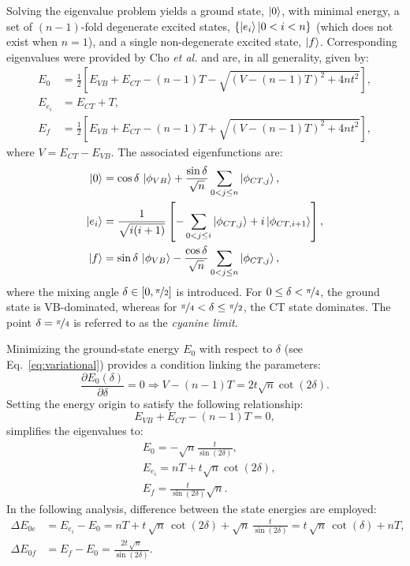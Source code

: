 \documentclass[USenglish]{article}
\begin{document}
Solving the eigenvalue problem yields a ground state, $\ket{0}$, with minimal energy, a set of $(n-1)$-fold degenerate excited states, $\{\ket{e_i} | 0<i< n\}$ (which does not exist when $n=1$), and a single non-degenerate excited state, $\ket{f}$.
Corresponding eigenvalues were provided by Cho \emph{et al.} \cite{choNonlinearOpticalProperties2002} and are, in all generality, given by:
\begin{align}
	E_{0} &= \frac{1}{2} \left[E_{VB} + E_{CT} - (n-1)T - \sqrt{(V - (n-1)T)^2 + 4nt^2}\right], \nonumber\\
	E_{e_i} &= E_{CT} + T, \nonumber\\
	E_{f} &= \frac{1}{2} \left[E_{VB} + E_{CT} - (n-1)T + \sqrt{(V - (n-1)T)^2 + 4nt^2}\right],
\end{align}
where $V = E_{CT} - E_{VB}$. 
The associated eigenfunctions are:
\begin{align}
	\ket{0} &= \cos\delta\,\ket{\phi_{VB}} + \frac{\sin\delta}{\sqrt{n}} \sum_{0<j\leq n} \ket{\phi_{CT,j}},\nonumber\\
	\ket{e_i} &= \frac{1}{\sqrt{i(i+1)}}\left[- \sum_{0<j\leq i} \ket{\phi_{CT,j}} +  i \ket{\phi_{CT,i+1}}\right],\nonumber\\
	\ket{f} &= \sin\delta\,\ket{\phi_{VB}} - \frac{\cos\delta}{\sqrt{n}} \sum_{0<j\leq n} \ket{\phi_{CT,j}},
\end{align}
where the mixing angle $\delta \in [0, \nicefrac{\pi}{2}]$ is introduced. For $0 \leq \delta < \nicefrac{\pi}{4}$, the ground state is VB-dominated, whereas for $\nicefrac{\pi}{4} < \delta \leq \nicefrac{\pi}{2}$, the CT state dominates. The point $\delta = \nicefrac{\pi}{4}$ is referred to as the \textit{cyanine limit}.

Minimizing the ground-state energy $E_0$ with respect to $\delta$ (see Eq.~\eqref{eq:variational})  provides a condition linking the parameters:
\begin{equation}
	\frac{\partial E_0(\delta)}{\partial \delta} = 0 \Rightarrow V - (n-1)T = 2t \sqrt{n} \cot(2\delta). \label{eq:cot}
\end{equation}
Setting the energy origin to satisfy the following relationship: 
\begin{equation}
	E_{VB} + E_{CT} - (n-1)T = 0, \label{eq:eorig}
\end{equation}
simplifies the eigenvalues to:
\begin{align}
	&E_{0} = -\sqrt{n} \frac{t}{\sin(2\delta)}, \nonumber\\
	&E_{e_i} = nT + t \sqrt{n} \cot(2\delta),\nonumber\\
	&E_{f} =  \frac{t}{\sin(2\delta)}\sqrt{n}.\label{eq:energies}
\end{align}
In the following analysis, difference between the state energies are employed:\begin{align}
	\Delta E_{0e} &= E_{e_i} - E_{0} = nT + t\,\sqrt{n}\,\cot{(2\delta)} + \sqrt{n}\,\frac{t}{\sin{(2\delta)}}  = t\,\sqrt{n}\,\cot(\delta) + nT,\nonumber\\
	\Delta E_{0f} &= E_f - E_0 = \frac{2t\,\sqrt{n}}{\sin(2\delta)}.
\end{align}
\end{document}
